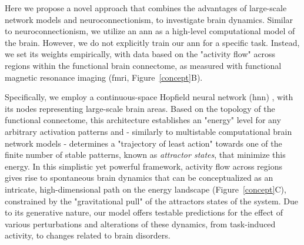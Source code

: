 \documentclass{article}
\begin{document}
Here we propose a novel approach that combines the advantages of large-scale network models and neuroconnectionism, to investigate brain dynamics.
Similar to neuroconnectionism, we utilize an \acrshort{ann} as a high-level computational model of the brain.
However, we do not explicitly train our \acrshort{ann} for a specific task. Instead, we set its weights empirically, with data based on the "activity flow" \citep{cole2016activity, ito2017cognitive} across regions within the functional brain connectome, as measured with functional magnetic resonance imaging (\acrshort{fmri}, Figure~\ref{concept}B).

Specifically, we employ a continuous-space Hopfield neural network (\acrshort{hnn}) \citep{hopfield1982neural, krotov2023new}, with its nodes representing large-scale brain areas. Based on the topology of the functional connectome, this architecture establishes an "energy" level for any arbitrary activation patterns and - similarly to multistable computational brain network models \citep{schirner2022dynamic} - determines a "trajectory of least action" towards one of the finite number of stable patterns, known as \textit{attractor states}, that minimize this energy.
In this simplistic yet powerful framework, activity flow \citep{cole2016activity} across regions gives rise to spontaneous brain dynamics that can be conceptualized as an intricate, high-dimensional path on the energy landscape (Figure~\ref{concept}C), constrained by the "gravitational pull" of the attractors states of the system.
Due to its generative nature, our model offers testable predictions for the effect of various perturbations and alterations of these dynamics, from task-induced activity, to changes related to brain disorders.
\end{document}
